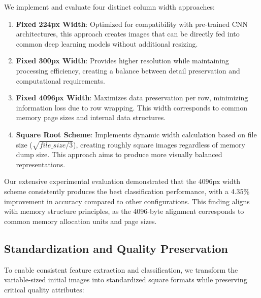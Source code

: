 We implement and evaluate four distinct column width approaches:

\begin{enumerate}
    \item \textbf{Fixed 224px Width}: Optimized for compatibility with pre-trained CNN architectures, this approach creates images that can be directly fed into common deep learning models without additional resizing.
    
    \item \textbf{Fixed 300px Width}: Provides higher resolution while maintaining processing efficiency, creating a balance between detail preservation and computational requirements.
    
    \item \textbf{Fixed 4096px Width}: Maximizes data preservation per row, minimizing information loss due to row wrapping. This width corresponds to common memory page sizes and internal data structures.
    
    \item \textbf{Square Root Scheme}: Implements dynamic width calculation based on file size ($\sqrt{file\_size/3}$), creating roughly square images regardless of memory dump size. This approach aims to produce more visually balanced representations.
\end{enumerate}

Our extensive experimental evaluation demonstrated that the 4096px width scheme consistently produces the best classification performance, with a 4.35\% improvement in accuracy compared to other configurations. This finding aligns with memory structure principles, as the 4096-byte alignment corresponds to common memory allocation units and page sizes.

\subsection{Standardization and Quality Preservation}
\label{subsec:standardization}

To enable consistent feature extraction and classification, we transform the variable-sized initial images into standardized square formats while preserving critical quality attributes:

